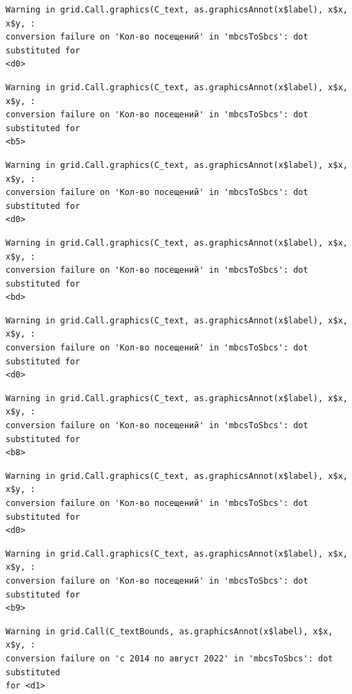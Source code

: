 \documentclass[
  letterpaper,
  DIV=11,
  numbers=noendperiod]{scrartcl}
\begin{document}
\begin{verbatim}
Warning in grid.Call.graphics(C_text, as.graphicsAnnot(x$label), x$x, x$y, :
conversion failure on 'Кол-во посещений' in 'mbcsToSbcs': dot substituted for
<d0>
\end{verbatim}

\begin{verbatim}
Warning in grid.Call.graphics(C_text, as.graphicsAnnot(x$label), x$x, x$y, :
conversion failure on 'Кол-во посещений' in 'mbcsToSbcs': dot substituted for
<b5>
\end{verbatim}

\begin{verbatim}
Warning in grid.Call.graphics(C_text, as.graphicsAnnot(x$label), x$x, x$y, :
conversion failure on 'Кол-во посещений' in 'mbcsToSbcs': dot substituted for
<d0>
\end{verbatim}

\begin{verbatim}
Warning in grid.Call.graphics(C_text, as.graphicsAnnot(x$label), x$x, x$y, :
conversion failure on 'Кол-во посещений' in 'mbcsToSbcs': dot substituted for
<bd>
\end{verbatim}

\begin{verbatim}
Warning in grid.Call.graphics(C_text, as.graphicsAnnot(x$label), x$x, x$y, :
conversion failure on 'Кол-во посещений' in 'mbcsToSbcs': dot substituted for
<d0>
\end{verbatim}

\begin{verbatim}
Warning in grid.Call.graphics(C_text, as.graphicsAnnot(x$label), x$x, x$y, :
conversion failure on 'Кол-во посещений' in 'mbcsToSbcs': dot substituted for
<b8>
\end{verbatim}

\begin{verbatim}
Warning in grid.Call.graphics(C_text, as.graphicsAnnot(x$label), x$x, x$y, :
conversion failure on 'Кол-во посещений' in 'mbcsToSbcs': dot substituted for
<d0>
\end{verbatim}

\begin{verbatim}
Warning in grid.Call.graphics(C_text, as.graphicsAnnot(x$label), x$x, x$y, :
conversion failure on 'Кол-во посещений' in 'mbcsToSbcs': dot substituted for
<b9>
\end{verbatim}

\begin{verbatim}
Warning in grid.Call(C_textBounds, as.graphicsAnnot(x$label), x$x, x$y, :
conversion failure on 'с 2014 по август 2022' in 'mbcsToSbcs': dot substituted
for <d1>
\end{verbatim}
\end{document}

